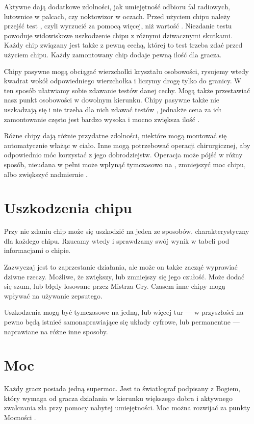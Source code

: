 Aktywne dają dodatkowe zdolności, jak umiejętność odbioru fal radiowych, lutownice w palcach, czy noktowizor w oczach.
Przed użyciem chipu należy przejść test \abnkp{}, czyli wyrzucić za pomocą \dxx{} więcej, niż wartość \abnkp{}. 
Niezdanie testu \abnkp{} powoduje widowiskowe uszkodzenie chipu z różnymi dziwacznymi skutkami.
Każdy chip związany jest także z pewną cechą, której to test trzeba zdać przed użyciem chipu.
Każdy zamontowany chip dodaje pewną ilość \abnkp{} dla gracza.

Chipy pasywne mogą obciągać wierzchołki kryształu osobowości, rysujemy wtedy kwadrat wokół odpowiedniego wierzchołka i liczymy drogę tylko do granicy.
W ten sposób ułatwiamy sobie zdawanie testów danej cechy.
Mogą także przestawiać nasz punkt osobowości w dowolnym kierunku.
Chipy pasywne także nie uszkadzają się i nie trzeba dla nich zdawać testów \abnkp{}, jednakże cena za ich zamontowanie często jest bardzo wysoka i mocno zwiększa ilość \abnkp{}.

Różne chipy dają różnie przydatne zdolności, niektóre mogą montować się automatycznie włażąc w ciało.
Inne mogą potrzebować operacji chirurgicznej, aby odpowiednio móc korzystać z jego dobrodziejstw.
Operacja może pójść w różny sposób, nieudana w pełni może wpłynąć tymczasowo na \abzyc{}, zmniejszyć moc chipu, albo zwiększyć nadmiernie \abnkp{}.

\section{Uszkodzenia chipu}
Przy nie zdaniu \abnkp{} chip może się uszkodzić na jeden ze sposobów, charakterystyczny dla każdego chipu.
Rzucamy wtedy \dx{} i sprawdzamy swój wynik w tabeli pod informacjami o chipie.

Zazwyczaj jest to zaprzestanie działania, ale może on także zacząć wyprawiać dziwne rzeczy.
Możliwe, że zwiększy, lub zmniejszy się jego czułość.
Może dodać się szum, lub błędy losowane przez Mistrza Gry.
Czasem inne chipy mogą wpływać na używanie zepsutego.

Uszkodzenia mogą być tymczasowe na jedną, lub więcej tur --- w przyszłości na pewno będą istnieć samonaprawiające się układy cyfrowe, lub permanentne --- naprawiane na różne inne sposoby.

\section{Moc}
Każdy gracz posiada jedną supermoc.
Jest to światłograf podpisany z Bogiem, który wymaga od gracza działania w kierunku większego dobra i aktywnego zwalczania zła przy pomocy nabytej umiejętności.
Moc można rozwijać za punkty Mocności \xpmcn{}.

